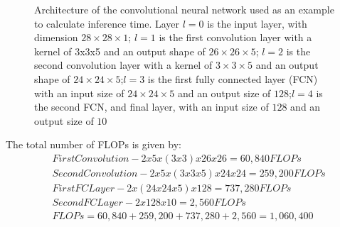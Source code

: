\begin{figure}[th!]
	\caption[Architecture of the convolutional neural network used as an example to calculate inference time]{ Architecture of the convolutional neural network used as an example to calculate inference time. Layer $l=0$ is the input layer, with dimension $28\times 28\times 1$; $l= 1$ is the first convolution layer with a kernel of 3x3x5 and an output shape of $26\times 26\times 5$; $l=2$ is the second convolution layer with a kernel of $3\times 3\times 5$ and an output shape of $24\times 24\times 5$;$l=3$ is the first fully connected layer (FCN) with an input size of $24\times 24\times 5$ and an output size of $128$;$l=4$ is the second FCN, and final layer, with an input size of $128$ and an output size of $10$ }
	\label{fig:example-convolutional-network}
\end{figure}
The total number of FLOPs is given by:
\begin{equation}
    \begin{aligned}
&First Convolution - 2x5x(3x3)x26x26 = 60,840 FLOPs \\
&Second Convolution -2x5x(3x3x5)x24x24 = 259,200 FLOPs \\
&First FC Layer - 2x(24x24x5)x128 = 737,280 FLOPs \\
&Second FC Layer - 2x128x10 = 2,560 FLOPs\\
&FLOPs = 60,840 + 259,200 + 737,280 + 2,560 = 1,060,400 
    \end{aligned}
\end{equation}

